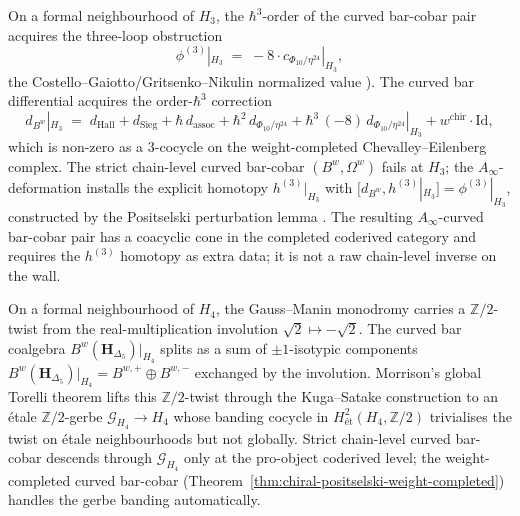 \begin{remark}[Curvature perturbation on $H_3$: three-loop
Costello $c_3 = -8$ and $A_\infty$ homotopy]
\label{rem:bcac-3}
On a formal neighbourhood of $H_3$, the $\hbar^3$-order of the
curved bar-cobar pair acquires the three-loop obstruction
\[
 \phi^{(3)}|_{H_3}
 \;=\; -8 \cdot c_{\Phi_{10}/\eta^{24}}|_{H_3},
\]
the Costello--Gaiotto/Gritsenko--Nikulin normalized value
\cite{Costello2013,CostelloGaiotto2018,
GritsenkoNikulin1998}). The curved bar differential acquires the
order-$\hbar^3$ correction
\[
 d_{B^w}|_{H_3}
 \;=\; d_{\mathrm{Hall}} + d_{\mathrm{Sieg}}
 + \hbar\, d_{\mathrm{assoc}}
 + \hbar^2\, d_{\Phi_{10}/\eta^{24}}
 + \hbar^3\, (-8)\, d_{\Phi_{10}/\eta^{24}}|_{H_3}
 + w^{\mathrm{chir}}\cdot\mathrm{Id},
\]
which is non-zero as a $3$-cocycle on the weight-completed
Chevalley--Eilenberg complex. The strict chain-level curved
bar-cobar $(B^w, \Omega^w)$ fails at $H_3$; the
$A_\infty$-deformation installs the explicit homotopy
$h^{(3)}|_{H_3}$ with
$[d_{B^w}, h^{(3)}|_{H_3}] = \phi^{(3)}|_{H_3}$,
constructed by the Positselski perturbation lemma
\cite[\S\S3--4]{Positselski11}. The resulting $A_\infty$-curved
bar-cobar pair has a coacyclic cone in the completed coderived
category and requires the $h^{(3)}$ homotopy as extra data; it is not
a raw chain-level inverse on the wall.
\end{remark}

\begin{remark}
\label{rem:bcac-4}
On a formal neighbourhood of $H_4$, the Gauss--Manin monodromy
carries a $\mathbb{Z}/2$-twist
\cite[Thm.~9.3]{Bruinier2002LNM} from the real-multiplication
involution $\sqrt{2}\mapsto -\sqrt{2}$. The curved bar coalgebra
$B^w(\mathbf{H}_{\Delta_5})|_{H_4}$ splits as a sum of $\pm
1$-isotypic components
$B^w(\mathbf{H}_{\Delta_5})|_{H_4} = B^{w, +}\oplus B^{w, -}$
exchanged by the involution. Morrison's global Torelli theorem
\cite{Morrison84} lifts this $\mathbb{Z}/2$-twist through the
Kuga--Satake construction \cite{KugaSatake67,Deligne72} to an
\'etale $\mathbb{Z}/2$-gerbe $\mathcal{G}_{H_4}\to H_4$ whose
banding cocycle in $H^2_{\text{\'et}}(H_4, \mathbb{Z}/2)$
trivialises the twist on \'etale neighbourhoods but not globally.
Strict chain-level curved bar-cobar descends through
$\mathcal{G}_{H_4}$ only at the pro-object coderived level; the
weight-completed curved bar-cobar
(Theorem~\ref{thm:chiral-positselski-weight-completed}) handles
the gerbe banding automatically.
\end{remark}


